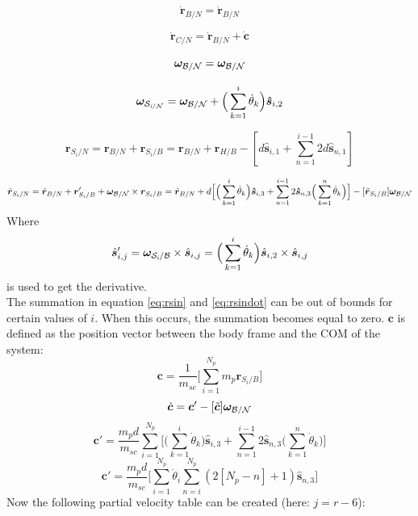 \documentclass[paper]{aiaaNew}
\begin{document}
\begin{equation}
\dot{\bm r}_{B/N} = \dot{\bm r}_{B/N}
\end{equation}

\begin{equation}
\dot{\bm r}_{C/N} = \dot{\bm r}_{B/N} + \dot{\bm c}
\label{eq:rDot_CN}
\end{equation}

\begin{equation}
\bm \omega_{\cal{B/N}} = \bm \omega_{\cal{B/N}}
\end{equation}

\begin{equation}
\bm \omega_{\cal S_{\textit{i}/N}} = \bm \omega_{\cal{B/N}} + \Big(\sum_{k=1}^{i} \dot{\theta}_k \Big) \bm{\hat{s}}_{i,2}
\end{equation}

\begin{equation}
\label{eq:rsin}
\bm r_{S_{i}/N} = \bm r_{B/N} + \bm r_{S_{i}/B} = \bm r_{B/N} + \bm r_{H/B} - [d\bm{\hat{s}}_{i,1} + \sum_{n=1}^{i-1} 2d\bm{\hat{s}}_{n,1} ]
\end{equation}

\begin{equation}
\label{eq:rsindot}
\dot{\bm r}_{S_{i}/N} = \dot{\bm r}_{B/N} + {\bm r}'_{S_{i}/B} + \bm \omega_{\cal{B/N}} \times {\bm r}_{S_{i}/B} = \dot{\bm r}_{B/N} + d\Big[\Big(\sum_{k=1}^{i} \dot{\theta}_k \Big) \bm{\hat{s}}_{i,3} + \sum_{n=1}^{i-1} 2\bm{\hat{s}}_{n,3}\Big(\sum_{k=1}^{n} \dot{\theta}_k \Big) \Big]  - [\tilde{{\bm r}}_{S_{i}/B}] \bm \omega_{\cal{B/N}}
\end{equation}
Where
\begin{equation}
\label{eq:sijp}
\hat{\bm s}'_{i,j} = \bm\omega_{\cal{S}_{\textit{i}}/\cal{B}}\times\hat{\bm s}_{i,j}=\Big(\sum_{k=1}^{i} \dot{\theta}_k \Big)\hat{\bm s}_{i,2}\times\hat{\bm s}_{i,j}
\end{equation}
is used to get the derivative.\\
The summation in equation \ref{eq:rsin} and \ref{eq:rsindot} can be out of bounds for certain values of $i$. When this occurs, the summation becomes equal to zero. $\bm c$ is defined as the position vector between the body frame and the COM of the system:
\begin{equation}
    \bm c = \frac{1}{m_{sc}}\Big[ \sum_{i=1}^{N_p} m_p {\bm r}_{S_i/B}\Big]
\end{equation}
\begin{equation}
\dot{\bm c} = {\bm c}' - [\tilde{\bm c}]{\bm \omega}_{\cal{B/N}} 
\end{equation}
\begin{equation}
{\bm c}' = \frac{m_p d}{m_{sc}} \sum_{i=1}^{N_p} \Big[\Big(\sum_{k=1}^{i} \dot{\theta}_k \Big) \bm{\hat{s}}_{i,3} + \sum_{n=1}^{i-1} 2\bm{\hat{s}}_{n,3}\Big(\sum_{k=1}^{n} \dot{\theta}_k \Big) \Big] 
\label{eq:cprime1}
\end{equation}
\begin{equation}
{\bm c}' = \frac{m_p d}{m_{sc}} \Big[\sum_{i=1}^{N_p} \dot{\theta}_i  \sum_{n=i}^{N_p} (2[N_p - n]+1 )\bm{\hat{s}}_{n,3}\Big] 
\label{eq:cprime2}
\end{equation}
Now the following partial velocity table can be created (here: $j = r-6$):
\end{document}
